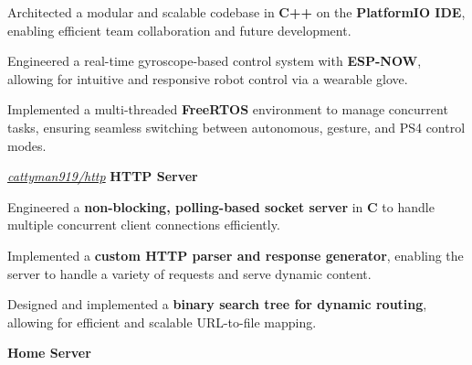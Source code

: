 \documentclass[../main.tex]{subfiles}
\begin{document}
\vspace{0.10 cm}
\begin{onecolentry}
\begin{highlights}
    \item Architected a modular and scalable codebase in \textbf{C++} on the \textbf{PlatformIO IDE}, enabling efficient team collaboration and future development.
    \item Engineered a real-time gyroscope-based control system with \textbf{ESP-NOW}, allowing for intuitive and responsive robot control via a wearable glove.
    \item Implemented a multi-threaded \textbf{FreeRTOS} environment to manage concurrent tasks, ensuring seamless switching between autonomous, gesture, and PS4 control modes.
\end{highlights}
\end{onecolentry}

\vspace{0.2 cm}

\begin{twocolentry}{
    \small
    \textit{\href{https://github.com/cattyman919/http}{cattyman919/http}}
}
    \textbf{HTTP Server}
\end{twocolentry}

\vspace{0.10 cm}
\begin{onecolentry}
\begin{highlights}
    \item Engineered a \textbf{non-blocking, polling-based socket server} in \textbf{C} to handle multiple concurrent client connections efficiently.
    \item Implemented a \textbf{custom HTTP parser and response generator}, enabling the server to handle a variety of requests and serve dynamic content.
    \item Designed and implemented a \textbf{binary search tree for dynamic routing}, allowing for efficient and scalable URL-to-file mapping.
\end{highlights}
\end{onecolentry}

\vspace{0.2 cm}

\begin{twocolentry}{
    \small
    \textit{\href{}{}}
}
    \textbf{Home Server}
\end{twocolentry}
\end{document}
